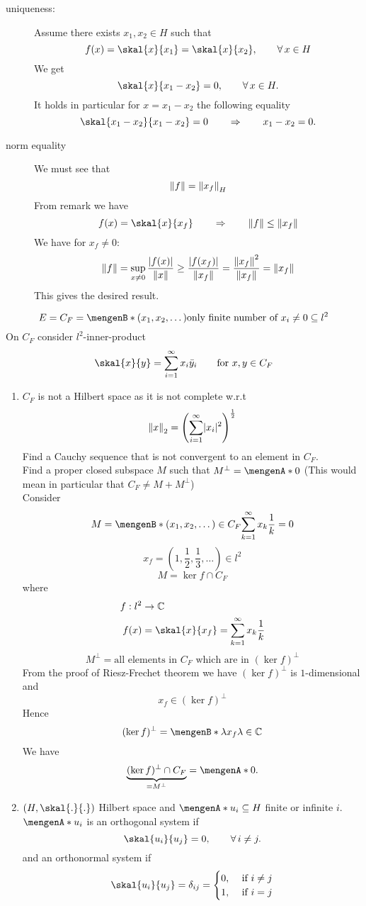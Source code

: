 \begin{beweis}
\begin{description}
\[		\]
		\item[uniqueness:] Assume there exists $x_1,x_2 \in H$ such that 
		\[
			f(x) = \skal{x}{x_1} = \skal{x}{x_2}, \qquad \forall\, x \in H
		\]
		We get
		\[
			\skal{x}{x_1-x_2} = 0, \qquad \forall\, x \in H.
		\]
		It holds in particular for $x = x_1 - x_2$ the following equality
		\[
			\skal{x_1-x_2}{x_1-x_2} = 0 \qquad \Rightarrow \qquad x_1-x_2 = 0.
		\]
		\item[norm equality] We must see that \[
			\norm{f} = \norm{x_f}_H
		\] From remark we have 
		\[
			f(x) = \skal{x}{x_f} \qquad \Rightarrow  \qquad \norm{f} \leq \norm{x_f}
		\]
		We have for $x_f \neq 0$:
		\[
			\norm{f} = \sup_{x \neq 0} \frac{\abs{f(x)}}{\norm{x}} \geq \frac{\abs{f(x_f)}}{\norm{x_f}} = \frac{\norm{x_f}^2}{\norm{x_f}} = \norm{x_f}
		\]
		This gives the desired result.
	\end{description}
\end{beweis}
\begin{beispiel}
	\[
		E = C_F = \set[(x_1,x_2,\dots)]{\text{only finite number of $x_i \neq 0$}} \subseteq l^2
	\]
	On $C_F$ consider $l^2$-inner-product
	\[
		\skal{x}{y} = \sum^{\infty}_{i=1} x_i \bar{y}_i \qquad \text{for }x,y \in C_F
	\]
	\begin{enumerate}
		\item $C_F$ is not a Hilbert space as it is not complete w.r.t
		\[
			\norm{x}_2 = \left( \sum^{\infty}_{i=1} \abs{x_i}^2 \right)^{\frac{1}{2}}
		\]
		Find a Cauchy sequence that is not convergent to an element in $C_F$. \\
		Find a proper closed subspace $M$ such that $M^{\perp}= \set{0}$ (This would mean in particular that $C_F \neq M + M^{\perp}$) \\
		Consider
		\[
			M = \set[(x_1,x_2,\dots) \in C_F]{\sum_{k=1}^{\infty} x_k \frac{1}{k}=0}
		\]
		\[
			x_f = (1, \frac{1}{2}, \frac{1}{3}, \dots) \in l^2
		\]
		\[
			M = \ker{f} \cap C_F
		\]
		where
		\begin{align*}
			f: l^2 &\to \mathbb{C} \\
			f(x) &= \skal{x}{x_f} = \sum_{k=1}^{\infty}x_k \frac{1}{k}
		\end{align*}
		\[
			M^{\perp} = \text{all elements in $C_F$ which are in $(\ker{f})^{\perp}$}
		\]
		From the proof of Riesz-Frechet theorem  we have $(\ker{f})^{\perp}$ is $1$-dimensional and \[
			x_f \in (\ker{f})^{\perp}
		\]
		Hence
		\[
			(\ker{f})^{\perp} = \set[\lambda x_f]{\lambda \in \mathbb{C}}
		\]
		We have
		\[
			\underset{= M ^{\perp}}{\underbrace{(\ker{f})^{\perp} \cap C_F}} = \set{0}.
		\]
		\item $(H,\skal{.}{.})$ Hilbert space and $\set{u_i} \subseteq H$ finite or infinite $i$. $\set{u_i}$ is an orthogonal system if
		\[
			\skal{u_i}{u_j}=0, \qquad \forall\, i \neq j.
		\]
		and an orthonormal system if
		\[
			\skal{u_i}{u_j} = \delta_{ij} = \begin{cases}
				0, &\text{ if }i \neq j\\
				1, &\text{ if }i = j
			\end{cases}
		\]
		\end{enumerate}
	\end{beispiel}
